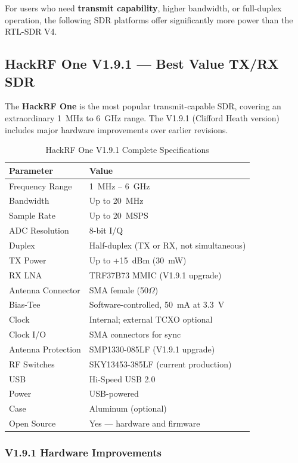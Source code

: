 \documentclass[12pt,a4paper]{article}
\begin{document}
For users who need \textbf{transmit capability}, higher bandwidth, or full-duplex 
operation, the following SDR platforms offer significantly more power than the RTL-SDR V4.

\subsection{HackRF One V1.9.1 — Best Value TX/RX SDR}

The \textbf{HackRF One} is the most popular transmit-capable SDR, covering an 
extraordinary 1~MHz to 6~GHz range. The V1.9.1 (Clifford Heath version) includes 
major hardware improvements over earlier revisions.

\begin{table}[h!]
\centering
\caption{HackRF One V1.9.1 Complete Specifications}
\begin{tabular}{@{}ll@{}}
\toprule
\textbf{Parameter} & \textbf{Value} \\
\midrule
Frequency Range & 1~MHz -- 6~GHz \\
Bandwidth & Up to 20~MHz \\
Sample Rate & Up to 20~MSPS \\
ADC Resolution & 8-bit I/Q \\
Duplex & Half-duplex (TX or RX, not simultaneous) \\
TX Power & Up to +15~dBm (30~mW) \\
RX LNA & TRF37B73 MMIC (V1.9.1 upgrade) \\
Antenna Connector & SMA female (50$\Omega$) \\
Bias-Tee & Software-controlled, 50~mA at 3.3~V \\
Clock & Internal; external TCXO optional \\
Clock I/O & SMA connectors for sync \\
Antenna Protection & SMP1330-085LF (V1.9.1 upgrade) \\
RF Switches & SKY13453-385LF (current production) \\
USB & Hi-Speed USB 2.0 \\
Power & USB-powered \\
Case & Aluminum (optional) \\
Open Source & Yes --- hardware and firmware \\
\bottomrule
\end{tabular}
\end{table}

\subsubsection{V1.9.1 Hardware Improvements}
\end{document}
